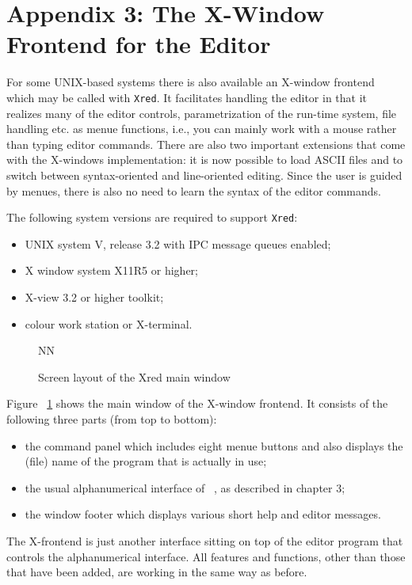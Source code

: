 \section*{Appendix 3: The X-Window Frontend for the Editor}


For some UNIX-based systems there is also available an X-window frontend which
may be called with {\tt Xred}.
It facilitates handling the editor in that it realizes many of the editor
controls, parametrization of the run-time system, file handling etc. as
menue functions, i.e., you can mainly work with a mouse rather than typing editor
commands.  There are also two important extensions that come with 
the X-windows implementation: it is now possible to load ASCII files
and to switch between syntax-oriented and line-oriented editing. Since the user
is guided by menues, there is also no need to learn the syntax of the
editor commands. 

The following system versions are required to support {\tt Xred}:
\begin{itemize}
\item UNIX system V, release 3.2 with IPC message queues enabled;
\item X window system X11R5 or higher;
\item X-view 3.2 or higher toolkit;
\item colour work station or X-terminal.
\end{itemize}

\begin{figure}[htb]
\let\picnaturalsize=N
\def\picsize{12cm}
\def\picfilename{pics/xred-main.eps}
\centerline{\ifx\picnaturalsize N\epsfxsize \picsize\fi \epsfbox{\picfilename}}
\caption{\label{window} Screen layout of the Xred main window}
\end{figure}

Figure ~\ref{window} shows the main window of the X-window frontend.
It consists of the following three parts (from top to bottom):
\begin{itemize}
\item  the command panel which includes eight menue buttons and also
displays the (file) name of the program that is actually in use;
\item the usual alphanumerical interface of \pired~, as described in
chapter 3;
\item the window footer which displays various short help and editor messages.
\end{itemize}
The X-frontend is just another interface sitting on top of
 the editor program that controls the alphanumerical interface. All features 
and functions, other than those that have been added,
 are working in the same way as before.

